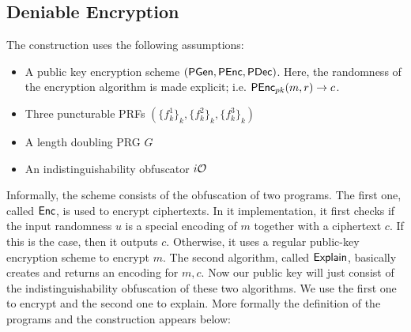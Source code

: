 \subsection{Deniable Encryption}
The construction uses the following assumptions:
\begin{itemize}
\item A public key encryption scheme $(\mathsf{PGen},\mathsf{PEnc},\mathsf{PDec})$. Here, the randomness of the encryption algorithm is made explicit; i.e. $\mathsf{PEnc}_{pk}(m,r)\to c$.
\item Three puncturable PRFs $(\{f_k^1\}_k,\{f_k^2\}_k,\{f_k^3\}_k)$
\item A length doubling PRG $G$
\item An indistinguishability obfuscator $i\mathcal{O}$
\end{itemize}

Informally, the scheme consists of the obfuscation of two programs. The first one, called $\mathsf{Enc}$, is used to encrypt ciphertexts. In it implementation, it first checks if the input randomness $u$ is a special encoding of $m$ together with a ciphertext $c$. If this is the case, then it outputs $c$. Otherwise, it uses a regular public-key encryption scheme to encrypt $m$. The second algorithm, called $\mathsf{Explain}$, basically creates and returns an encoding for $m,c$. Now our public key will just consist of the indistinguishability obfuscation of these two algorithms. We use the first one to encrypt and the second one to explain. More formally the definition of the programs and the construction appears below:

